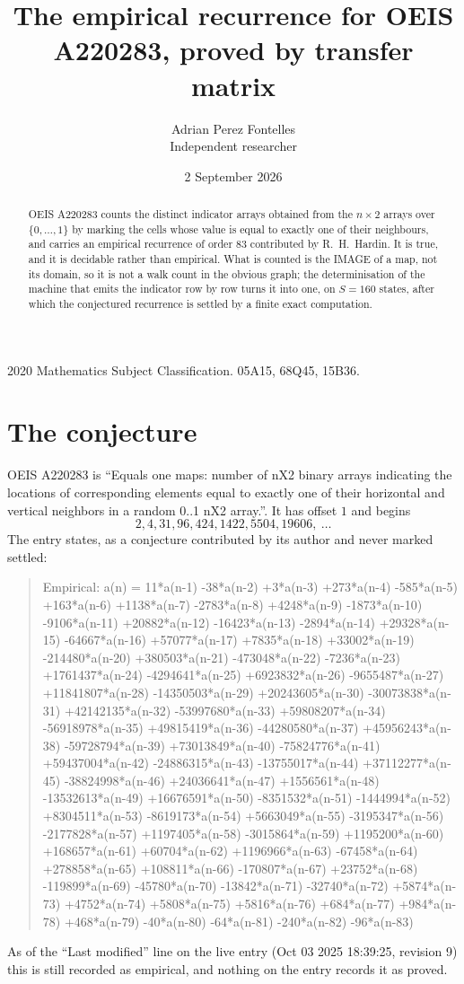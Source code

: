 \documentclass[11pt,a4paper]{article}
\title{The empirical recurrence for OEIS A220283, proved by transfer matrix}
\author{Adrian Perez Fontelles\\ \small Independent researcher}
\date{2 September 2026}
\theoremstyle{plain}
\theoremstyle{definition}
\begin{document}
\maketitle

\begin{abstract}
OEIS A220283 counts the distinct indicator arrays obtained from the $n\times2$ arrays over
$\{0,\dots,1\}$ by marking the cells whose value is equal to exactly one of their neighbours, and carries an
empirical recurrence of order $83$ contributed by R.~H.~Hardin. It is true, and it is
decidable rather than empirical. What is counted is the IMAGE of a map, not its domain, so it
is not a walk count in the obvious graph; the determinisation of the machine that emits the
indicator row by row turns it into one, on $S=160$ states, after which the conjectured
recurrence is settled by a finite exact computation.
\end{abstract}

\noindent\small 2020 Mathematics Subject Classification. 05A15, 68Q45, 15B36.\normalsize

\section{The conjecture}

OEIS A220283 is ``Equals one maps: number of nX2 binary arrays indicating the locations of corresponding elements equal to exactly one of their horizontal and vertical neighbors in a random 0..1 nX2 array.''. It has offset $1$ and begins
\[
2, 4, 31, 96, 424, 1422, 5504, 19606,\ \dots
\]
The entry states, as a conjecture contributed by its author and never marked settled:
\begin{quote}
Empirical: a(n) = 11*a(n-1) -38*a(n-2) +3*a(n-3) +273*a(n-4) -585*a(n-5) +163*a(n-6) +1138*a(n-7) -2783*a(n-8) +4248*a(n-9) -1873*a(n-10) -9106*a(n-11) +20882*a(n-12) -16423*a(n-13) -2894*a(n-14) +29328*a(n-15) -64667*a(n-16) +57077*a(n-17) +7835*a(n-18) +33002*a(n-19) -214480*a(n-20) +380503*a(n-21) -473048*a(n-22) -7236*a(n-23) +1761437*a(n-24) -4294641*a(n-25) +6923832*a(n-26) -9655487*a(n-27) +11841807*a(n-28) -14350503*a(n-29) +20243605*a(n-30) -30073838*a(n-31) +42142135*a(n-32) -53997680*a(n-33) +59808207*a(n-34) -56918978*a(n-35) +49815419*a(n-36) -44280580*a(n-37) +45956243*a(n-38) -59728794*a(n-39) +73013849*a(n-40) -75824776*a(n-41) +59437004*a(n-42) -24886315*a(n-43) -13755017*a(n-44) +37112277*a(n-45) -38824998*a(n-46) +24036641*a(n-47) +1556561*a(n-48) -13532613*a(n-49) +16676591*a(n-50) -8351532*a(n-51) -1444994*a(n-52) +8304511*a(n-53) -8619173*a(n-54) +5663049*a(n-55) -3195347*a(n-56) -2177828*a(n-57) +1197405*a(n-58) -3015864*a(n-59) +1195200*a(n-60) +168657*a(n-61) +60704*a(n-62) +1196966*a(n-63) -67458*a(n-64) +278858*a(n-65) +108811*a(n-66) -170807*a(n-67) +23752*a(n-68) -119899*a(n-69) -45780*a(n-70) -13842*a(n-71) -32740*a(n-72) +5874*a(n-73) +4752*a(n-74) +5808*a(n-75) +5816*a(n-76) +684*a(n-77) +984*a(n-78) +468*a(n-79) -40*a(n-80) -64*a(n-81) -240*a(n-82) -96*a(n-83)
\end{quote}
As of the ``Last modified'' line on the live entry (Oct 03 2025 18:39:25, revision 9) this is still
recorded as empirical, and nothing on the entry records it as proved.
\end{document}

